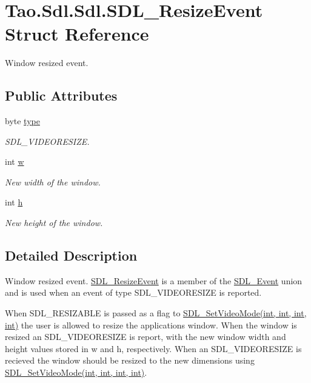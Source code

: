 \hypertarget{struct_tao_1_1_sdl_1_1_sdl_1_1_s_d_l___resize_event}{
\section{Tao.Sdl.Sdl.SDL\_\-ResizeEvent Struct Reference}
\label{struct_tao_1_1_sdl_1_1_sdl_1_1_s_d_l___resize_event}
}


Window resized event.  


\subsection*{Public Attributes}
\begin{DoxyCompactItemize}
\item 
byte \hyperlink{struct_tao_1_1_sdl_1_1_sdl_1_1_s_d_l___resize_event_a7fa36da4af0c8c0cff8c2cdbfb95deae}{type}
\begin{DoxyCompactList}\small\item\em SDL\_\-VIDEORESIZE. \item\end{DoxyCompactList}\item 
int \hyperlink{struct_tao_1_1_sdl_1_1_sdl_1_1_s_d_l___resize_event_a8f6f20c5400a87f876c1bfb86142e449}{w}
\begin{DoxyCompactList}\small\item\em New width of the window. \item\end{DoxyCompactList}\item 
int \hyperlink{struct_tao_1_1_sdl_1_1_sdl_1_1_s_d_l___resize_event_a70a07c2d10124122f44f28d4fb83e4b7}{h}
\begin{DoxyCompactList}\small\item\em New height of the window. \item\end{DoxyCompactList}\end{DoxyCompactItemize}


\subsection{Detailed Description}
Window resized event. \hyperlink{struct_tao_1_1_sdl_1_1_sdl_1_1_s_d_l___resize_event}{SDL\_\-ResizeEvent} is a member of the \hyperlink{struct_tao_1_1_sdl_1_1_s_d_l___event}{SDL\_\-Event} union and is used when an event of type SDL\_\-VIDEORESIZE is reported. 

When SDL\_\-RESIZABLE is passed as a flag to \hyperlink{_sdl_8cs_a961f7efdc2a7ec3860e93140853092f7}{SDL\_\-SetVideoMode(int, int, int, int)} the user is allowed to resize the applications window. When the window is resized an SDL\_\-VIDEORESIZE is report, with the new window width and height values stored in w and h, respectively. When an SDL\_\-VIDEORESIZE is recieved the window should be resized to the new dimensions using \hyperlink{_sdl_8cs_a961f7efdc2a7ec3860e93140853092f7}{SDL\_\-SetVideoMode(int, int, int, int)}. 

